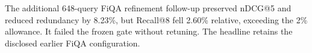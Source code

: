 The additional 648-query FiQA refinement follow-up preserved nDCG@5 and reduced redundancy by 8.23\%, but Recall@8 fell 2.60\% relative, exceeding the 2\% allowance. It failed the frozen gate without retuning. The headline retains the disclosed earlier FiQA configuration.
